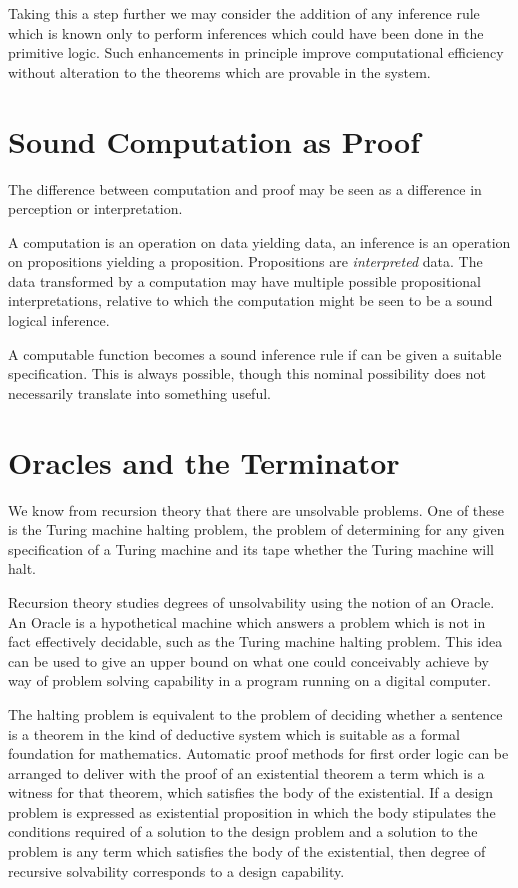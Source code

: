 Taking this a step further we may consider the addition of any
inference rule which is known only to perform inferences which could
have been done in the primitive logic.
Such enhancements in principle improve computational efficiency
without alteration to the theorems which are provable in the system.

\section{Sound Computation as Proof}

The difference between computation and proof may be seen as a difference in
perception or interpretation.

A computation is an operation on data yielding data, an inference is
an operation on propositions yielding a proposition.
Propositions are {\it interpreted} data.
The data transformed by a computation may have multiple possible
propositional interpretations, relative to which the computation might
be seen to be a sound logical inference.

A computable function becomes a sound inference rule if can be given a
suitable specification.
This is always possible, though this nominal possibility does not
necessarily translate into something useful.

\section{Oracles and the Terminator} 

We know from recursion theory that there are unsolvable problems.
One of these is the Turing machine halting problem, the problem of
determining for any given specification of a Turing machine and its
tape whether the Turing machine will halt.

Recursion theory studies degrees of unsolvability using the notion of
an Oracle.
An Oracle is a hypothetical machine which answers a problem which is
not in fact effectively decidable, such as the Turing machine halting
problem.
This idea can be used to give an upper bound on what one could
conceivably achieve by way of problem solving capability in a program
running on a digital computer.

The halting problem is equivalent to the problem of deciding whether a
sentence is a theorem in the kind of deductive system which is
suitable as a formal foundation for mathematics.
Automatic proof methods for first order logic can be arranged to
deliver with the proof of an existential theorem a term which is a
witness for that theorem, which satisfies the body of the existential.
If a design problem is expressed as existential proposition in which
the body stipulates the conditions required of a solution to the
design problem and a solution to the problem is any term which
satisfies the body of the existential, then degree of recursive
solvability corresponds to a design capability.


